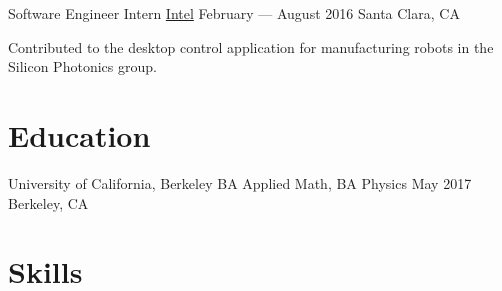 \documentclass[letterpaper]{resume_config}
\begin{document}
\WorkExperience
    {Software Engineer Intern} %
    {\href{https://intel.com}{Intel}} %
    {February --- August 2016} %
    {Santa Clara, CA} %
    {
        \item Contributed to the desktop control application for manufacturing robots in the Silicon Photonics group.
    }
\vspace{-10pt}




\section{Education}

\EducationExperience
    {University of California, Berkeley} %
    {BA Applied Math, BA Physics} %
    {May 2017} %
    {Berkeley, CA} %

\vspace{-14pt}

\section{Skills}

\vspace{1pt}

\end{document}
